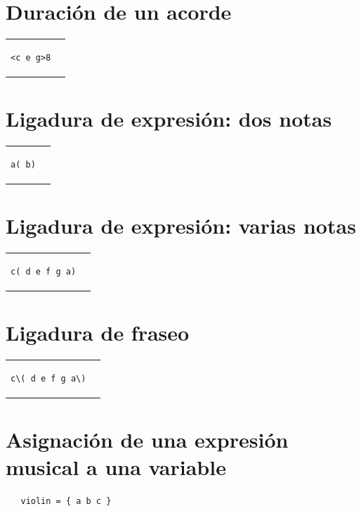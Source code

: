 \documentclass[a4paper,10pt,oneside,headinclude,titlepage]{article} %
\begin{document}
\section*{Duración de un acorde}
\begin{tabular}{m{2cm}m{2cm}}
\begin{verbatim}
<c e g>8
\end{verbatim}
&
\begin[fragment,relative=1,notime]{lilypond}
<c e g>8
\end{lilypond}
\end{tabular}

\section*{Ligadura de expresión: dos notas}
\begin{tabular}{m{2cm}m{2cm}}
\begin{verbatim}
a( b)
\end{verbatim}
&
\begin[fragment,relative=1,notime]{lilypond}
a( b)
\end{lilypond}
\end{tabular}

\section*{Ligadura de expresión: varias notas}
\begin{tabular}{m{2cm}m{2cm}}
\begin{verbatim}
c( d e f g a)
\end{verbatim}
&
\begin[fragment,relative=1,notime]{lilypond}
c( d e f g a)
\end{lilypond}
\end{tabular}

\section*{Ligadura de fraseo}
\begin{tabular}{m{2.5cm}m{2cm}}
\begin{verbatim}
c\( d e f g a\)
\end{verbatim}
&
\begin[fragment,relative=1,notime]{lilypond}
c\( d e f g a\)
\end{lilypond}
\end{tabular}

\section*{Asignación de una expresión musical a una variable}
\begin{verbatim}
   violin = { a b c }
\end{verbatim}
\end{document}
